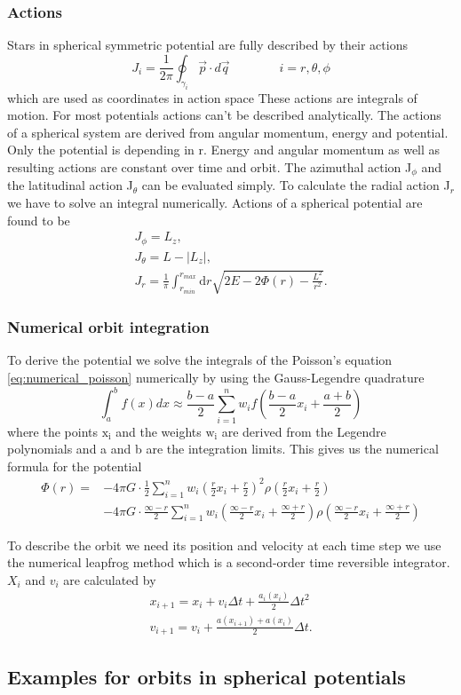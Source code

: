 \subsubsection{Actions}\label{sec:actions}

Stars in spherical symmetric potential are fully described by their actions \begin{equation}
J_i=\frac{1}{2\pi}\oint_{\gamma_i}\vec{p}\cdot d\vec{q} \qquad\qquad i=r,\theta,\phi
\end{equation} which are used as coordinates in action space
These actions are integrals of motion. For most potentials actions can't be described analytically. The actions of a spherical system are derived from angular momentum, energy and potential. Only the potential is depending in r. Energy and angular momentum as well as resulting actions are constant over time and orbit. The azimuthal action J\(_\phi\) and the latitudinal action J\(_\theta\) can be evaluated simply. To calculate the radial action J\(_r\) we have to solve an integral numerically. Actions of a spherical potential are found to be 
\begin{align}\label{eq:actions}
J_\phi=L_z, \\ J_\theta=L-|L_z|, \\ J_r=\frac{1}{\pi} \int_{r_{min}}^{r_{max}} \mathrm{d}r \sqrt{2E-2\Phi(r)-\frac{L^2}{r^2}}. 
\end{align}

\subsubsection{Numerical orbit integration}\label{sec:num_int}
To derive the potential we solve the integrals of the Poisson's equation \eqref{eq:numerical_poisson} numerically by using the Gauss-Legendre quadrature 
\begin{equation}\label{eq:Gauss-Legendre}
\int_a^b f(x)dx \approx \frac{b-a}{2}\sum_{i=1}^n w_i f\left(\frac{b-a}{2}x_i+\frac{a+b}{2}\right)
\end{equation} where the points \(\mathrm{x_i}\) and the weights \(\mathrm{w_i}\) are derived from the Legendre polynomials and a and b are the integration limits. This gives us the numerical formula for the potential 
\begin{equation}\label{eq:numerical_potential}
\begin{aligned}
\Phi(r)= & -4\pi G \cdot \frac{1}{2}\sum_{i=1}^n  w_i\left(\frac{r}{2}x_i+\frac{r}{2}\right)^2\rho\left(\frac{r}{2} x_i+ \frac{r}{2}\right) \\
&-4\pi G\cdot\frac{\infty-r}{2}\sum_{i=1}^n w_i\left(\frac{\infty-r}{2} x_i +\frac{\infty+r}{2}\right)\rho\left(\frac{\infty-r}{2} x_i +\frac{\infty+r}{2}\right)
\end{aligned}
\end{equation}
\par To describe the orbit we need its position and velocity at each time step we use the numerical leapfrog method which is a second-order time reversible integrator. \(X_i\) and \(v_i\) are calculated by 
\begin{align}
x_{i+1}=x_i+v_i\Delta t+\frac{a_i(x_i)}{2}\Delta t^2 \\
v_{i+1}=v_i+\frac{a(x_{i+1})+a(x_i)}{2}\Delta t.
\end{align}
\subsection{Examples for orbits in spherical potentials}\label{sec:orbit_examples}
